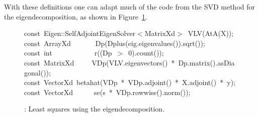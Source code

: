 \documentclass[shortnames,article,nojss]{jss}
\newcommand{\hlstd}[1]{\textcolor[rgb]{0,0,0}{#1}}
\newcommand{\hlnum}[1]{\textcolor[rgb]{0,0,0}{#1}}
\newcommand{\hlopt}[1]{\textcolor[rgb]{0,0,0}{#1}}
\newcommand{\hlkwb}[1]{\textcolor[rgb]{0.13,0.54,0.13}{#1}}
\newcommand{\hlkwd}[1]{\textcolor[rgb]{0,0,0}{#1}}
\begin{document}
With these definitions one can adapt much of the code from the SVD
method for the eigendecomposition, as shown in Figure~\ref{SymmEigLS}.
\begin{figure}[htb]
    \noindent
    \ttfamily
    \hlkwb{const\ }\hlstd{Eigen}\hlopt{::}\hlstd{SelfAdjointEigenSolver}\hlopt{$<$}\hlstd{MatrixXd}\hlopt{$>$\ }\hlstd{}\hlkwd{VLV}\hlstd{}\hlopt{(}\hlstd{}\hlkwd{AtA}\hlstd{}\hlopt{(}\hlstd{X}\hlopt{));}\hspace*{\fill}\\
    \hlstd{}\hlkwb{const\ }\hlstd{ArrayXd}\hlstd{\ \ \ \ \ \ \ }\hlstd{}\hlkwd{Dp}\hlstd{}\hlopt{(}\hlstd{}\hlkwd{Dplus}\hlstd{}\hlopt{(}\hlstd{eig}\hlopt{.}\hlstd{}\hlkwd{eigenvalues}\hlstd{}\hlopt{()).}\hlstd{}\hlkwd{sqrt}\hlstd{}\hlopt{());}\hspace*{\fill}\\
    \hlstd{}\hlkwb{const\ int}\hlstd{\ \ \ \ \ \ \ \ \ \ \ \ }\hlkwb{}\hlstd{}\hlkwd{r}\hlstd{}\hlopt{((}\hlstd{Dp\ }\hlopt{$>$\ }\hlstd{}\hlnum{0}\hlstd{}\hlopt{).}\hlstd{}\hlkwd{count}\hlstd{}\hlopt{());}\hspace*{\fill}\\
    \hlstd{}\hlkwb{const\ }\hlstd{MatrixXd}\hlstd{\ \ \ \ \ }\hlstd{}\hlkwd{VDp}\hlstd{}\hlopt{(}\hlstd{VLV}\hlopt{.}\hlstd{}\hlkwd{eigenvectors}\hlstd{}\hlopt{()\ {*}\ }\hlstd{Dp}\hlopt{.}\hlstd{}\hlkwd{matrix}\hlstd{}\hlopt{().}\hlstd{}\hlkwd{asDiagonal}\hlstd{}\hlopt{());}\hspace*{\fill}\\
    \hlstd{}\hlkwb{const\ }\hlstd{VectorXd\ }\hlkwd{betahat}\hlstd{}\hlopt{(}\hlstd{VDp\ }\hlopt{{*}\ }\hlstd{VDp}\hlopt{.}\hlstd{}\hlkwd{adjoint}\hlstd{}\hlopt{()\ {*}\ }\hlstd{X}\hlopt{.}\hlstd{}\hlkwd{adjoint}\hlstd{}\hlopt{()\ {*}\ }\hlstd{y}\hlopt{);}\hspace*{\fill}\\
    \hlstd{}\hlkwb{const\ }\hlstd{VectorXd}\hlstd{\ \ \ \ \ \ }\hlstd{}\hlkwd{se}\hlstd{}\hlopt{(}\hlstd{s\ }\hlopt{{*}\ }\hlstd{VDp}\hlopt{.}\hlstd{}\hlkwd{rowwise}\hlstd{}\hlopt{().}\hlstd{}\hlkwd{norm}\hlstd{}\hlopt{());}\hlstd{}\hspace*{\fill}\\
    \mbox{}
    \normalfont
    \normalsize
  \caption{: Least squares using the eigendecomposition.}
  \label{SymmEigLS}
\end{figure}
\end{document}
